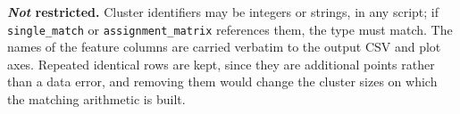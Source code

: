 \documentclass[a4paper,11pt]{article}
\begin{document}
\vspace{0.4em}
\noindent\textbf{\emph{Not} restricted.} Cluster identifiers may be integers or strings, in any script; if \texttt{single\_match} or \texttt{assignment\_matrix} references them, the type must match. The names of the feature columns are carried verbatim to the output CSV and plot axes. Repeated identical rows are kept, since they are additional points rather than a data error, and removing them would change the cluster sizes on which the matching arithmetic is built.

\end{document}
